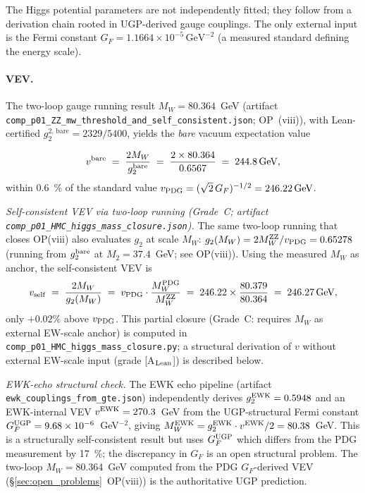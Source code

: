 \documentclass[11pt]{article}
\theoremstyle{remark}
\begin{document}
The Higgs potential parameters are not independently fitted; they follow from a derivation chain rooted in UGP-derived gauge couplings.
The only external input is the Fermi constant $G_F = 1.1664 \times 10^{-5}\,\text{GeV}^{-2}$ (a measured standard defining the energy scale).

\paragraph{VEV.}
\begin{sloppypar}
The two-loop gauge running result $M_W = 80.364$~GeV (artifact \texttt{comp\_p01\_ZZ\_mw\_threshold\_\allowbreak and\_self\_consistent.json}; OP~(viii)), with Lean-certified $g_2^{2,\,\mathrm{bare}} = 2329/5400$, yields the \emph{bare} vacuum expectation value
\end{sloppypar}
\[
v^{\rm bare} \;=\; \frac{2M_W}{g_2^{\rm bare}} \;=\; \frac{2 \times 80.364}{0.6567} \;=\; 244.8\,\text{GeV},
\]
within \SI{0.6}{\percent} of the standard value $v_{\rm PDG} = ({\sqrt{2}\,G_F})^{-1/2} = \SI{246.22}{GeV}$.

\emph{Self-consistent VEV via two-loop running (Grade~C; artifact \texttt{comp\_p01\_HMC\_higgs\_mass\_\allowbreak closure.json}).}
The same two-loop running that closes OP(viii) also evaluates $g_2$ at scale $M_W$:
$g_2(M_W) = 2 M_W^{\rm ZZ} / v_{\rm PDG} = 0.65278$ (running from $g_2^{\rm bare}$ at $M_2 = 37.4$~GeV; see OP(viii)).
Using the measured $M_W$ as anchor, the self-consistent VEV is
\begin{equation}
v_{\rm self} \;=\; \frac{2M_W}{g_2(M_W)} \;=\; v_{\rm PDG}\cdot\frac{M_W^{\rm PDG}}{M_W^{\rm ZZ}} \;=\; 246.22 \times \frac{80.379}{80.364} \;=\; 246.27\,\text{GeV},
\label{eq:vev_self}
\end{equation}
only $+0.02\%$ above $v_{\rm PDG}$.  This partial closure (Grade~C: requires $M_W$ as external EW-scale anchor) is computed in \texttt{comp\_p01\_HMC\_higgs\_mass\_closure.py}; a structural derivation of $v$ without external EW-scale input (grade [A$_{\rm Lean}$]) is described below.

\emph{EWK-echo structural check.}  The EWK echo pipeline (artifact \texttt{ewk\_couplings\_from\_gte.json}) independently derives $g_2^{\rm EWK} = 0.5948$ and an EWK-internal VEV $v^{\rm EWK} = 270.3$~GeV from the UGP-structural Fermi constant $G_F^{\rm UGP} = 9.68 \times 10^{-6}$~GeV$^{-2}$, giving $M_W^{\rm EWK} = g_2^{\rm EWK}\cdot v^{\rm EWK}/2 = 80.38$~GeV.  This is a structurally self-consistent result but uses $G_F^{\rm UGP}$ which differs from the PDG measurement by \SI{17}{\percent}; the discrepancy in $G_F$ is an open structural problem.  The two-loop $M_W = 80.364$~GeV computed from the PDG $G_F$-derived VEV (\S\ref{sec:open_problems}~OP(viii)) is the authoritative UGP prediction.
\end{document}
